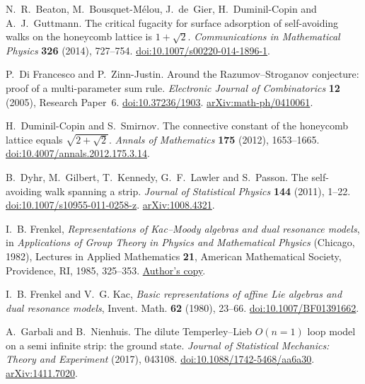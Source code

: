 N.~R.~Beaton, M.~Bousquet-M\'elou, J.~de~Gier, H.~Duminil-Copin and A.~J.~Guttmann.
The critical fugacity for surface adsorption of self-avoiding walks on the honeycomb lattice is $1+\sqrt2$.
\emph{Communications in Mathematical Physics} \textbf{326} (2014), 727--754.
\href{https://doi.org/10.1007/s00220-014-1896-1}{doi:10.1007/s00220-014-1896-1}.

P.~Di Francesco and P.~Zinn-Justin.
Around the Razumov--Stroganov conjecture: proof of a multi-parameter sum rule.
\emph{Electronic Journal of Combinatorics} \textbf{12} (2005), Research Paper~6.
\href{https://doi.org/10.37236/1903}{doi:10.37236/1903}.
\href{https://arxiv.org/abs/math-ph/0410061}{arXiv:math-ph/0410061}.

H.~Duminil-Copin and S.~Smirnov.
The connective constant of the honeycomb lattice equals $\sqrt{2+\sqrt2}$.
\emph{Annals of Mathematics} \textbf{175} (2012), 1653--1665.
\href{https://doi.org/10.4007/annals.2012.175.3.14}{doi:10.4007/annals.2012.175.3.14}.

B.~Dyhr, M.~Gilbert, T.~Kennedy, G.~F.~Lawler and S.~Passon.
The self-avoiding walk spanning a strip.
\emph{Journal of Statistical Physics} \textbf{144} (2011), 1--22.
\href{https://doi.org/10.1007/s10955-011-0258-z}{doi:10.1007/s10955-011-0258-z}.
\href{https://arxiv.org/abs/1008.4321}{arXiv:1008.4321}.

I.~B. Frenkel,
\emph{Representations of Kac--Moody algebras and dual resonance models},
in \emph{Applications of Group Theory in Physics and Mathematical Physics}
(Chicago, 1982), Lectures in Applied Mathematics \textbf{21},
American Mathematical Society, Providence, RI, 1985, 325--353.
\href{https://cpb-us-w2.wpmucdn.com/campuspress.yale.edu/dist/2/3739/files/2021/06/frenkel_representations_kac_moody.pdf}{Author's copy}.

I.~B. Frenkel and V.~G. Kac,
\emph{Basic representations of affine Lie algebras and dual resonance models},
Invent. Math. \textbf{62} (1980), 23--66.
\href{https://doi.org/10.1007/BF01391662}{doi:10.1007/BF01391662}.

A.~Garbali and B.~Nienhuis.
The dilute Temperley--Lieb $O(n=1)$ loop model on a semi infinite strip:
the ground state.
\emph{Journal of Statistical Mechanics: Theory and Experiment} (2017), 043108.
\href{https://doi.org/10.1088/1742-5468/aa6a30}{doi:10.1088/1742-5468/aa6a30}.
\href{https://arxiv.org/abs/1411.7020}{arXiv:1411.7020}.

